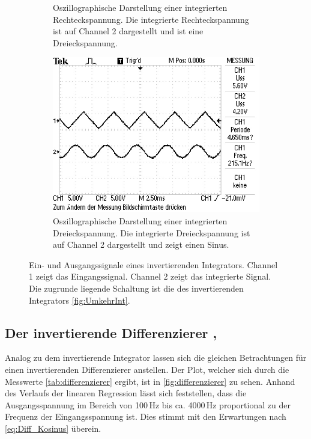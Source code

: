 \begin{figure}
\begin{subfigure}[b]{0.45\textwidth}
        \caption{Oszillographische Darstellung einer integrierten Rechteckspannung.
        Die integrierte Rechteckspannung ist auf Channel 2 dargestellt und ist eine Dreieckspannung.\cite{int_picture}}
        \label{fig:int_recht}
    \end{subfigure}
    \newline
    \newline  
    \newline
    \newline  
    \newline  
    \begin{subfigure}{0.45\textwidth}
        \centering
        \includegraphics[width=\textwidth]{data_of_others_cuz_ours_suck/int/int_dreieck.JPG}
        \caption{Oszillographische Darstellung einer integrierten Dreieckspannung.
        Die integrierte Dreieckspannung ist auf Channel 2 dargestellt und zeigt einen Sinus.\cite{int_picture}}
        \label{fig:int_drei}
    \end{subfigure}
       \caption{Ein- und Ausgangssignale eines invertierenden Integrators. Channel 1 zeigt
       das Eingangssignal. Channel 2 zeigt das integrierte Signal.
       Die zugrunde liegende 
       Schaltung ist die des invertierenden Integrators \autoref{fig:UmkehrInt}.}
       \label{fig:int}
\end{figure}
\FloatBarrier


\subsection{Der invertierende Differenzierer \cite{int_data}, \cite{int_picture}}
Analog zu dem invertierende Integrator lassen sich die gleichen Betrachtungen 
für einen invertierenden Differenzierer anstellen.
Der Plot, welcher sich durch die Messwerte \autoref{tab:differenzierer} ergibt, ist in
\autoref{fig:differenzierer} zu sehen.
Anhand des Verlaufs der linearen Regression lässt sich feststellen, dass die Ausgangsspannung
im Bereich von 100\,Hz bis ca. 4000\,Hz proportional zu der Frequenz der Eingangsspannung ist.
Dies stimmt mit den Erwartungen nach \autoref{eq:Diff_Kosinus} überein.


